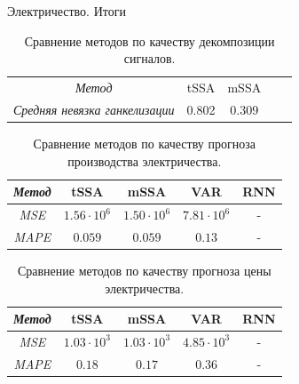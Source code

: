 	\begin{frame}{Электричество. Итоги}
		
		\begin{table}[h]
			\caption{Сравнение методов по качеству декомпозиции сигналов.}
			\begin{tabular}{lllll}
				\cline{1-3}
				\multicolumn{1}{|c|}{\textit{Метод}}                        & \multicolumn{1}{c|}{tSSA}  & \multicolumn{1}{c|}{mSSA}  &  &  \\ \cline{1-3}
				\multicolumn{1}{|c|}{\textit{Средняя невязка ганкелизации}} & \multicolumn{1}{c|}{0.802} & \multicolumn{1}{c|}{0.309} &  &  \\ \cline{1-3}
			\end{tabular}
		\end{table}
		
		\begin{table}[h]
			\caption{Сравнение методов по качеству прогноза производства электричества.}
			\begin{tabular}{ccccc}
				\hline
				\multicolumn{1}{|c|}{\textit{Метод}} & \multicolumn{1}{c|}{tSSA} & \multicolumn{1}{c|}{mSSA} & \multicolumn{1}{c|}{VAR} & \multicolumn{1}{c|}{RNN} \\ \hline
				\multicolumn{1}{|c|}{\textit{MSE}}   & \multicolumn{1}{c|}{$1.56 \cdot 10^6$}     & \multicolumn{1}{c|}{$1.50 \cdot 10^6$}     & \multicolumn{1}{c|}{$7.81 \cdot 10^6$}    & \multicolumn{1}{c|}{-}    \\ \hline
				\multicolumn{1}{|c|}{\textit{MAPE}}  & \multicolumn{1}{c|}{$0.059$}     & \multicolumn{1}{c|}{$0.059$}     & \multicolumn{1}{c|}{$0.13$}    & \multicolumn{1}{c|}{-}    \\ \hline
			\end{tabular}
		\end{table}
		
		\begin{table}[h]
			\caption{Сравнение методов по качеству прогноза цены электричества.}
			\begin{tabular}{ccccc}
				\hline
				\multicolumn{1}{|c|}{\textit{Метод}} & \multicolumn{1}{c|}{tSSA} & \multicolumn{1}{c|}{mSSA} & \multicolumn{1}{c|}{VAR} & \multicolumn{1}{c|}{RNN} \\ \hline
				\multicolumn{1}{|c|}{\textit{MSE}}   & \multicolumn{1}{c|}{$1.03 \cdot 10^3$}     & \multicolumn{1}{c|}{$1.03 \cdot 10^3$}     & \multicolumn{1}{c|}{$4.85 \cdot 10^3$}    & \multicolumn{1}{c|}{-}    \\ \hline
				\multicolumn{1}{|c|}{\textit{MAPE}}  & \multicolumn{1}{c|}{$0.18$}     & \multicolumn{1}{c|}{$0.17$}     & \multicolumn{1}{c|}{$0.36$}    & \multicolumn{1}{c|}{-}    \\ \hline   
			\end{tabular}
		\end{table}

	\end{frame}

	
	
